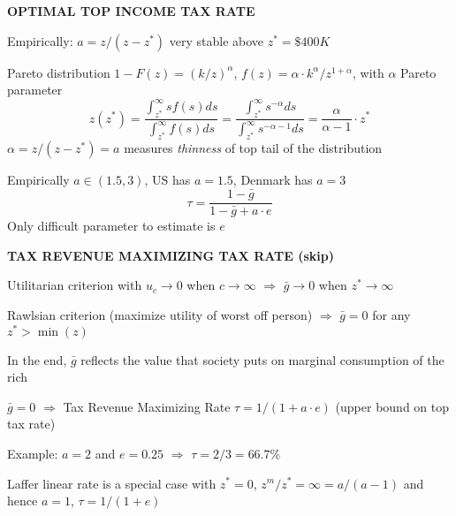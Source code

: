 \documentclass[landscape]{slides}
\begin{document}
\begin{slide}

\end{slide}


\begin{slide}
\begin{center}
{\bf OPTIMAL TOP INCOME TAX RATE}
\end{center}
Empirically: $a=z/(z-z^*)$ very stable above $z^*=\$400K$

Pareto distribution $1-F(z)=(k/z)^{\alpha}$, $f(z)=\alpha \cdot k^{\alpha}/z^{1+{\alpha}}$,
with ${\alpha}$ Pareto parameter
$$z(z^*) = \frac{ \int_{z^*}^{\infty} s f(s)ds }{\int_{z^*}^{\infty} f(s)ds }
= \frac{ \int_{z^*}^{\infty} s^{-{\alpha}} ds
}{\int_{z^*}^{\infty} s^{-{\alpha}-1} ds } = \frac{{\alpha}}{{\alpha}-1} \cdot
z^*$$  ${\alpha}=z/(z-z^*)=a$ measures {\em thinness} of top tail of the
distribution

Empirically $a \in (1.5,3)$, US has $a=1.5$, Denmark has $a=3$
$$\tau=\frac{1-\bar{g}}{1-\bar{g}+a \cdot e}$$
Only difficult parameter to estimate is $e$
\end{slide}

\begin{slide}
\begin{center}
{\bf TAX REVENUE MAXIMIZING TAX RATE (skip)}
\end{center}
Utilitarian criterion with $u_c  \rightarrow 0$ when $c
\rightarrow \infty$ $\Rightarrow$ $\bar{g} \rightarrow 0$ when
$z^* \rightarrow \infty$

Rawlsian criterion (maximize utility of worst off person) $\Rightarrow$ $\bar{g}=0$ for any
$z^*>\min(z)$

In the end, $\bar{g}$ reflects the value that society puts on
marginal consumption of the rich

$\bar{g}=0$ $\Rightarrow$ Tax Revenue Maximizing Rate $\tau=1/(1+a \cdot
e)$ (upper bound on top tax rate)

Example: $a=2$ and $e=0.25$ $\Rightarrow$
$\tau=2/3=66.7\%$

Laffer linear rate is a special case with $z^*=0$,
$z^m/z^*=\infty=a/(a-1)$ and hence $a=1$,
$\tau=1/(1+e)$
\end{slide}


%
%
%
\end{document}
